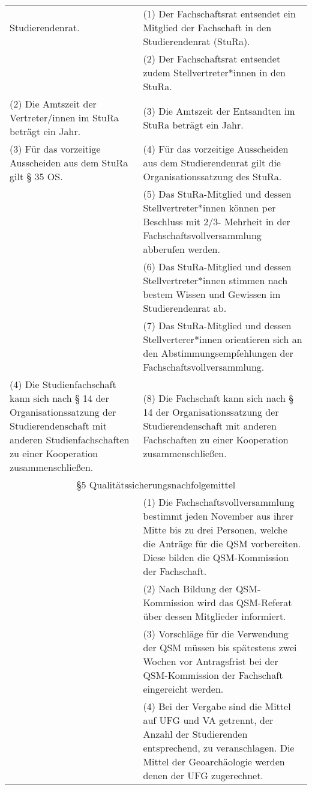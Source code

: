 {\begin{longtable}{|p{7.5cm}|p{7.5cm}|}
        Studierendenrat.&(1)  Der Fachschaftsrat entsendet ein Mitglied der Fachschaft in den Studierendenrat
        (StuRa).\\
        &(2) Der Fachschaftsrat entsendet zudem Stellvertreter*innen in den StuRa. \\
        (2)  Die Amtszeit der Vertreter/innen im StuRa beträgt ein Jahr.& (3)  Die Amtszeit der Entsandten im StuRa beträgt ein Jahr.\\
        (3)  Für das vorzeitige Ausscheiden aus dem StuRa gilt § 35 OS. & (4)  Für das vorzeitige Ausscheiden aus dem Studierendenrat gilt die
        Organisationssatzung des StuRa. \\
        &(5) Das StuRa-Mitglied und dessen Stellvertreter*innen können per Beschluss mit 2/3-
        Mehrheit in der Fachschaftsvollversammlung abberufen werden. \\
        &(6) Das StuRa-Mitglied und dessen Stellvertreter*innen stimmen nach bestem Wissen und
        Gewissen im Studierendenrat ab. \\
        &(7) Das StuRa-Mitglied und dessen Stellverterer*innen orientieren sich an den
        Abstimmungsempfehlungen der Fachschaftsvollversammlung. \\
        (4)  Die Studienfachschaft kann sich nach § 14 der Organisationssatzung der
        Studierendenschaft mit anderen Studienfachschaften zu einer Kooperation
        zusammenschließen.&
        (8)  Die Fachschaft kann sich nach § 14 der Organisationssatzung der
        Studierendenschaft mit anderen Fachschaften zu einer Kooperation zusammenschließen.\\\hline
        \multicolumn{2}{|c|}{§5 Qualitätssicherungsnachfolgemittel}\\\hline
        &(1) Die Fachschaftsvollversammlung bestimmt jeden November aus ihrer Mitte bis zu
        drei Personen, welche die Anträge für die QSM vorbereiten. Diese bilden die
        QSM-Kommission der Fachschaft.\\
        &(2) Nach Bildung der QSM-Kommission wird das QSM-Referat über dessen Mitglieder
        informiert. \\
        &(3) Vorschläge für die Verwendung der QSM müssen bis spätestens zwei Wochen vor
        Antragsfrist bei der QSM-Kommission der Fachschaft eingereicht werden.\\
        &(4) Bei der Vergabe sind die Mittel auf UFG und VA getrennt, der Anzahl der
        Studierenden entsprechend, zu veranschlagen. Die Mittel der Geoarchäologie werden
        denen der UFG zugerechnet. \\

\end{longtable}}
